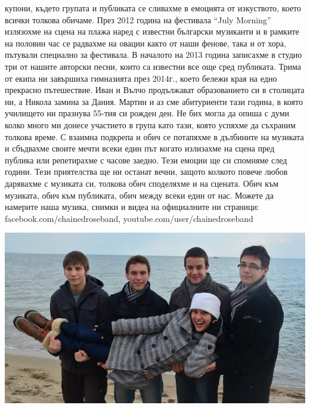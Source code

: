 \begin{multicols}{3}
купони, където групата и публиката се сливахме в емоцията от изкуството, което 
всички толкова обичаме. През 2012 година на фестивала “July Morning” излязохме 
на сцена на плажа наред с известни български музиканти и в рамките на половин 
час се радвахме на овации както от наши фенове, така и от хора, пътували 
специално за фестивала. В началото на 2013 година записахме в студио три от 
нашите авторски песни, които са известни все още сред публиката. Трима от екипа 
ни завършиха гимназията през 2014г., което бележи края на едно прекрасно 
пътешествие. Иван и Вълчо продължават образованието си в столицата ни, а Никола 
замина за Дания. Мартин и аз сме абитуриенти тази година, в която училището ни 
празнува 55-тия си рожден ден. 
Не бих могла да опиша с думи колко много ми донесе участието в група като тази, 
която успяхме да съхраним толкова време. С взаимна подкрепа и обич се потапяхме 
в дълбините на музиката и сбъдвахме своите мечти всеки един път когато излизахме 
на сцена пред публика или репетирахме с часове заедно. Тези емоции ще си 
спомняме след години. Тези приятелства ще ни останат вечни, защото колкото 
повече любов дарявахме с музиката си, толкова обич споделяхме и на сцената. Обич 
към музиката, обич към публиката, обич между всеки един от нас. 
Можете да намерите наша музика, снимки и видеа на официалните ни страници: 
facebook.com/chainedroseband, 
\small{youtube.com/user/chainedroseband}
\end{multicols}

\begin{center}
\includegraphics[width=5.7in]{./Chained_Rose/CR.jpg}
\end{center}

\closearticle
